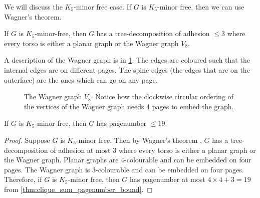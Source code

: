 We will discuss the \(K_5\)-minor free case. If \(G\) is \(K_5\)-minor free, then we can use Wagner's theorem.
\begin{theorem}\label{thm:WagnersTheorem}
	If \(G\) is \(K_5\)-minor-free, then \(G\) has a tree-decomposition of adhesion $\leq 3$ where every torso is either a planar graph or the Wagner graph \(V_8\).
\end{theorem}
A description of the Wagner graph is in \cref{fig:wagner}. The edges are coloured such that the internal edges are on different pages. The spine edges (the edges that are on the outerface) are the ones which can go on any page.
\begin{figure}[h!]
	\centering
	\begin{tikzpicture}
		
	\end{tikzpicture}
	\caption{The Wagner graph $V_8$. Notice how the clockwise circular ordering of the vertices of the Wagner graph needs 4 pages to embed the graph. }\label{fig:wagner}
\end{figure}

\begin{theorem}
	If \(G\) is \(K_5\)-minor free, then \(G\) has pagenumber \(\leq 19\).
\end{theorem}

\begin{proof}
	Suppose \(G\) is \(K_5\)-minor free. Then by Wagner's theorem \cite{wagnerUeberEigenschaftEbenen1937}, \(G\) has a tree-decomposition of adhesion at most 3 where every torso is either a planar graph or the Wagner graph.
	Planar graphs are \(4\)-colourable and can be embedded on four pages. The Wagner graph is \(3\)-colourable and can be embedded on four pages. Therefore, if \(G\) is \(K_5\)-minor free, then \(G\) has pagenumber at most \(4 \times 4 + 3 = 19\) from \cref{thm:clique_sum_pagenumber_bound}.
\end{proof}